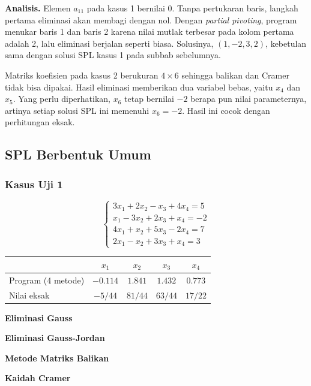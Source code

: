 \textbf{Analisis.} Elemen $a_{11}$ pada kasus 1 bernilai 0. Tanpa pertukaran baris, langkah pertama eliminasi akan membagi dengan nol. Dengan \textit{partial pivoting}, program menukar baris 1 dan baris 2 karena nilai mutlak terbesar pada kolom pertama adalah 2, lalu eliminasi berjalan seperti biasa. Solusinya, $(1, -2, 3, 2)$, kebetulan sama dengan solusi SPL kasus 1 pada subbab sebelumnya.

Matriks koefisien pada kasus 2 berukuran $4 \times 6$ sehingga balikan dan Cramer tidak bisa dipakai. Hasil eliminasi memberikan dua variabel bebas, yaitu $x_4$ dan $x_5$. Yang perlu diperhatikan, $x_6$ tetap bernilai $-2$ berapa pun nilai parameternya, artinya setiap solusi SPL ini memenuhi $x_6 = -2$. Hasil ini cocok dengan perhitungan eksak.

\subsection{SPL Berbentuk Umum}

\subsubsection{Kasus Uji 1}
\begin{kasus}
\[
\begin{cases}
3x_1 + 2x_2 - x_3 + 4x_4 = 5 \\
x_1 - 3x_2 + 2x_3 + x_4 = -2 \\
4x_1 + x_2 + 5x_3 - 2x_4 = 7 \\
2x_1 - x_2 + 3x_3 + x_4 = 3
\end{cases}
\]
\begin{center}
\begin{tabular}{lcccc}
\toprule
 & $x_1$ & $x_2$ & $x_3$ & $x_4$ \\
\midrule
Program (4 metode) & $-0.114$ & $1.841$ & $1.432$ & $0.773$ \\
Nilai eksak & $-5/44$ & $81/44$ & $63/44$ & $17/22$ \\
\bottomrule
\end{tabular}
\end{center}
\textbf{Eliminasi Gauss}

\textbf{Eliminasi Gauss-Jordan}

\textbf{Metode Matriks Balikan}

\textbf{Kaidah Cramer}
\end{kasus}

